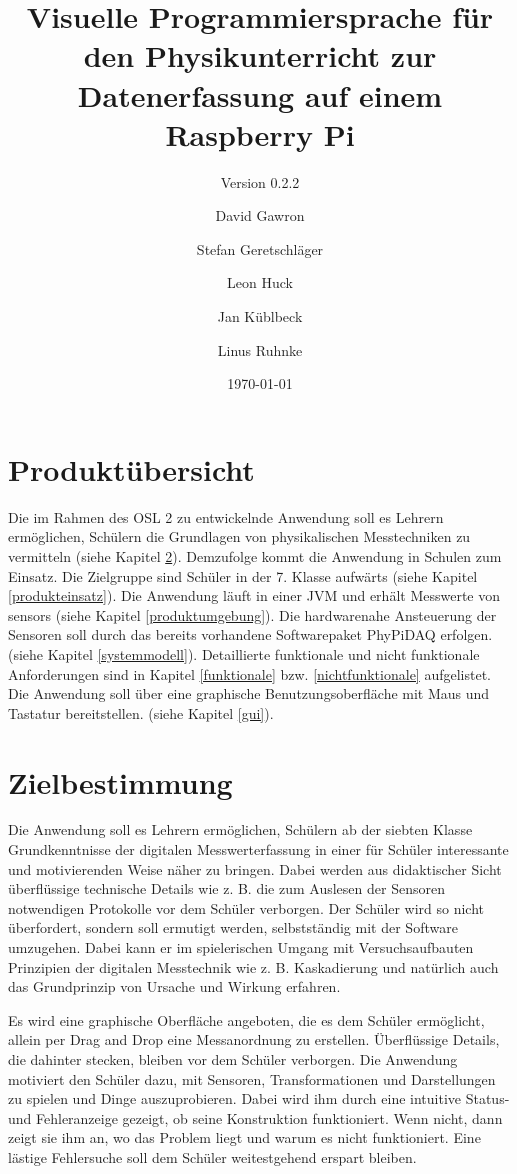 \documentclass[parskip=full]{scrartcl}
\title{Visuelle Programmiersprache für den Physikunterricht zur Datenerfassung auf einem Raspberry Pi}
\subtitle{Version 0.2.2}
\author{David Gawron \and Stefan Geretschläger \and Leon Huck \and Jan Küblbeck \and Linus Ruhnke}
\date{\today}
\begin{document}
\maketitle

\newpage
\tableofcontents 					%
\newpage

\section{Produktübersicht} %

Die im Rahmen des \gls{OSL 2} zu entwickelnde Anwendung soll es Lehrern ermöglichen, Schülern die Grundlagen von physikalischen Messtechniken zu vermitteln (siehe Kapitel \ref{zielbestimmung}).
Demzufolge kommt die Anwendung in Schulen zum Einsatz. 
Die Zielgruppe sind Schüler in der 7. Klasse aufwärts (siehe Kapitel \ref{produkteinsatz}).
Die Anwendung läuft in einer JVM und erhält Messwerte von \glspl{sensor} (siehe Kapitel \ref{produktumgebung}). 
Die hardwarenahe Ansteuerung der Sensoren soll durch das bereits vorhandene Softwarepaket \gls{PhyPiDAQ} erfolgen. (siehe Kapitel \ref{systemmodell}).
Detaillierte funktionale und nicht funktionale Anforderungen sind in Kapitel \ref{funktionale} bzw. \ref{nichtfunktionale} aufgelistet.
Die Anwendung soll über eine graphische Benutzungsoberfläche mit Maus und Tastatur bereitstellen. (siehe Kapitel \ref{gui}).

\section{Zielbestimmung}\label{zielbestimmung}

Die Anwendung soll es Lehrern ermöglichen, Schülern ab der siebten Klasse Grundkenntnisse der digitalen Messwerterfassung in einer für Schüler interessante und motivierenden Weise näher zu bringen. 
Dabei werden aus didaktischer Sicht überflüssige technische Details wie z. B. die zum Auslesen der Sensoren notwendigen Protokolle vor dem Schüler verborgen.
Der Schüler wird so nicht überfordert, sondern soll ermutigt werden, selbstständig mit der Software umzugehen. 
Dabei kann er im spielerischen Umgang mit Versuchsaufbauten Prinzipien der digitalen Messtechnik wie z. B. Kaskadierung und natürlich auch das Grundprinzip von Ursache und Wirkung erfahren.

Es wird eine graphische Oberfläche angeboten, die es dem Schüler ermöglicht, allein per Drag and Drop eine Messanordnung zu erstellen. 
Überflüssige Details, die dahinter stecken, bleiben vor dem Schüler verborgen.
Die Anwendung motiviert den Schüler dazu, mit Sensoren, Transformationen und Darstellungen zu spielen und Dinge auszuprobieren. 
Dabei wird ihm durch eine intuitive Status- und Fehleranzeige gezeigt, ob seine Konstruktion funktioniert. 
Wenn nicht, dann zeigt sie ihm an, wo das Problem liegt und warum es nicht funktioniert. 
Eine lästige Fehlersuche soll dem Schüler weitestgehend erspart bleiben. 
\end{document}

